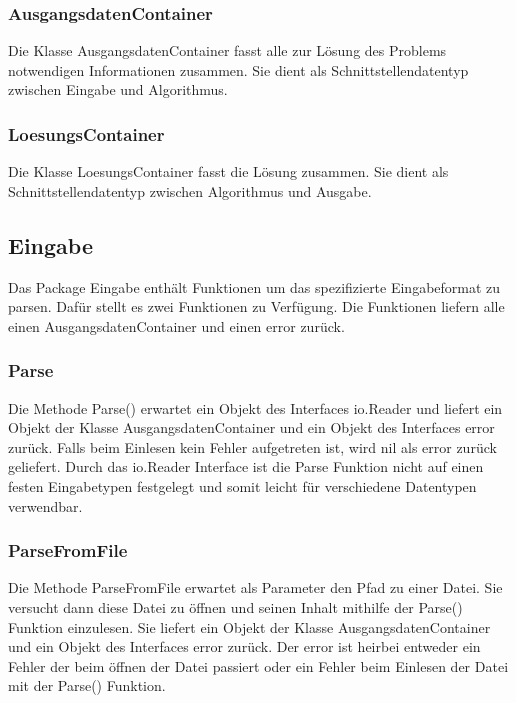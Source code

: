 \subsubsection{AusgangsdatenContainer}

Die Klasse AusgangsdatenContainer fasst alle zur Lösung des Problems notwendigen Informationen zusammen.
Sie dient als Schnittstellendatentyp zwischen Eingabe und Algorithmus.

\subsubsection{LoesungsContainer}

Die Klasse LoesungsContainer fasst die Lösung zusammen.
Sie dient als Schnittstellendatentyp zwischen Algorithmus und Ausgabe.

\pagebreak

\subsection{Eingabe}

Das Package Eingabe enthält Funktionen um das spezifizierte Eingabeformat zu parsen.
Dafür stellt es zwei Funktionen zu Verfügung.
Die Funktionen liefern alle einen AusgangsdatenContainer und einen error zurück.

\subsubsection{Parse}

Die Methode Parse() erwartet ein Objekt des Interfaces io.Reader und liefert ein Objekt der Klasse AusgangsdatenContainer und ein Objekt des Interfaces error zurück.
Falls beim Einlesen kein Fehler aufgetreten ist, wird nil als error zurück geliefert.
Durch das io.Reader Interface ist die Parse Funktion nicht auf einen festen Eingabetypen festgelegt und somit leicht für verschiedene Datentypen verwendbar.

\subsubsection{ParseFromFile}

Die Methode ParseFromFile erwartet als Parameter den Pfad zu einer Datei.
Sie versucht dann diese Datei zu öffnen und seinen Inhalt mithilfe der Parse() Funktion einzulesen.
Sie liefert ein Objekt der Klasse AusgangsdatenContainer und ein Objekt des Interfaces error zurück.
Der error ist heirbei entweder ein Fehler der beim öffnen der Datei passiert oder ein Fehler beim Einlesen der Datei mit der Parse() Funktion.

